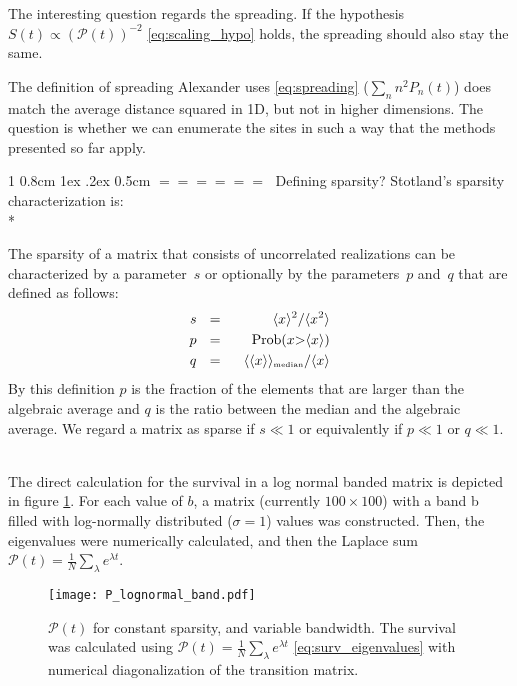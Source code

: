 \documentclass[onecolumn,fleqn,notitlepage,secnumarabic]{revtex4}
\makeatletter
\newcommand{\tbox}[1]{\mbox{\tiny #1}}
\newenvironment{fminipage}%
  {\begin{Sbox}\begin{minipage}}%
  {\end{minipage}\end{Sbox}\fbox{\TheSbox}}
\def\section{%
  \@startsection
    {section}%
    {1}%
    {\z@}%
    {0.8cm \@plus1ex \@minus .2ex}%
    {0.5cm}%
    {\Large\bf $=\!=\!=\!=\!=\!=\;$}%
}%
\makeatother
\begin{document}
The interesting question regards the spreading. If the hypothesis $S(t) \propto \left(\mathcal{P}(t)\right)^{-2}$ \eqref{eq:scaling_hypo} holds, the spreading should also stay the same. 

The definition of spreading Alexander uses \eqref{eq:spreading} ($\sum_n n^2 P_n(t)$) does match the average distance squared in 1D, but not in higher dimensions. The question is whether we can enumerate the sites in such a way that the methods presented so far apply.

\section{Defining sparsity?}
Stotland's \cite{Stotland:2010:PRB}  sparsity characterization is:\\*
\begin{fminipage}{\textwidth}
The sparsity of a matrix that consists of 
uncorrelated realizations can be characterized 
by a parameter~$s$ or optionally 
by the parameters~$p$ and~$q$ that 
are defined as follows: 
%
\begin{align}
s \ \ &=& \ \ \langle x \rangle^2 / \langle x^2 \rangle \\
p \ \ &=& \ \ \mbox{Prob}(x {>} \langle x\rangle) \\
q \ \ &=& \ \ \langle\langle x \rangle\rangle_{\tbox{median}}/\langle x \rangle
\end{align}
%
By this definition $p$ is the fraction of the elements that 
are larger than the algebraic average and $q$ is the ratio between the median
and the algebraic average.
We regard a matrix as sparse if $s\ll1$  
or equivalently if $p \ll 1$ or $q \ll 1$. 

\end{fminipage}
\\

The direct calculation for the survival in a log normal banded matrix is depicted in figure \ref{fig:p_lognormal_band}. For each value of $b$, a matrix (currently $100
\times 100$) with a band b filled with log-normally distributed ($\sigma=1$) values was constructed. Then, the eigenvalues were numerically calculated, and then the Laplace sum $\mathcal{P}(t) =\frac{1}{N}\sum_\lambda e^{\lambda t}$.
\begin{figure}
\texttt{[image: P\_lognormal\_band.pdf]}
\caption{$\mathcal{P}(t)$ for constant sparsity, and variable bandwidth. The survival was calculated using $\mathcal{P}(t) =\frac{1}{N}\sum_\lambda e^{\lambda t}$ \eqref{eq:surv_eigenvalues} with numerical diagonalization of the transition matrix.
}
\label{fig:p_lognormal_band}
\end{figure}
\end{document}
